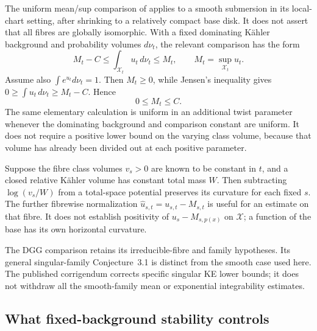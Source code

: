 The uniform mean/sup comparison of
\cite[Proposition~3.3, actual pp.~26--29]{DGG26FamiliesCorrectedV3}
applies to a smooth submersion in its local-chart setting, after
shrinking to a relatively compact base disk. It does not assert
that all fibres are globally isomorphic. With a fixed dominating
K\"ahler background and probability volumes $d\nu_t$, the relevant
comparison has the form
\begin{equation*}
 M_t-C\leq\int_{\mathcal X_t}u_t\,d\nu_t\leq M_t,
 \qquad M_t=\sup_{\mathcal X_t}u_t.
\tag{H.75}\label{eq:appH-KE-mean-sup-comparison}
\end{equation*}
Assume also $\int e^{u_t}d\nu_t=1$. Then $M_t\geq0$, while
Jensen's inequality gives
$0\geq\int u_t\,d\nu_t\geq M_t-C$. Hence
\begin{equation*}
                        0\leq M_t\leq C.
\tag{H.76}\label{eq:appH-KE-supremum-bound}
\end{equation*}
The same elementary calculation is uniform in an additional twist
parameter whenever the dominating background and comparison constant
are uniform. It does not require a positive lower bound on the
varying class volume, because that volume has already been divided
out at each positive parameter.

Suppose the fibre class volumes $v_s>0$ are known to be constant
in $t$, and a closed relative K\"ahler volume has constant total
mass $W$. Then subtracting $\log(v_s/W)$ from a total-space
potential preserves its curvature for each fixed $s$. The further
fibrewise normalization $\widehat u_{s,t}=u_{s,t}-M_{s,t}$ is useful
for an estimate on that fibre. It does not establish positivity of
$u_s-M_{s,p(x)}$ on $\mathcal X$; a function of the base has its
own horizontal curvature.

The DGG comparison retains its irreducible-fibre and family hypotheses.
Its general singular-family Conjecture~3.1 is distinct from the smooth
case used here. The published corrigendum
\cite{DGG26CorrigendumPublished} corrects specific singular KE lower
bounds; it does not withdraw all the smooth-family mean or exponential
integrability estimates.

\subsection{What fixed-background stability controls}
\label{sec:appH-KE-stability-scope}

